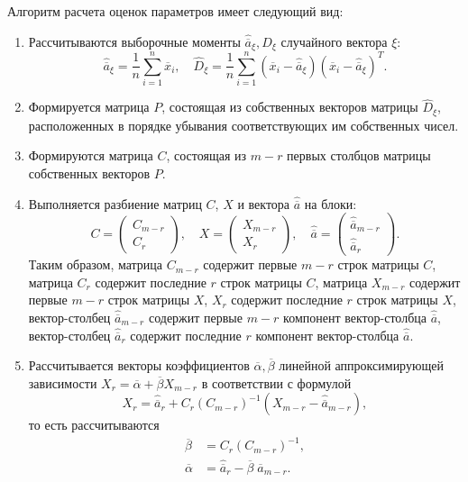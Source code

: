 Алгоритм расчета оценок параметров имеет следующий вид:
\begin{enumerate}
\item Рассчитываются выборочные моменты \( \hat{\overline{a}}_{\xi}, D_{\xi} \) случайного вектора \( \xi \):
  \begin{equation*}
    \hat{\overline{a}}_{\xi} = \dfrac{1}{n} \sum_{i=1}^n \overline{x}_i, \quad
    \hat{D}_{\xi} =
    \dfrac{1}{n}  \sum_{i=1}^n
    (\overline{x}_i - \hat{\overline{a}}_{\xi})
    (\overline{x}_i - \hat{\overline{a}}_{\xi})^T.
  \end{equation*}
\item Формируется матрица \( P \), состоящая из собственных векторов матрицы \( \hat{D}_{\xi} \),
  расположенных в порядке убывания соответствующих им собственных чисел.
\item Формируются матрица \( C \), состоящая из \( m-r \) первых столбцов
  матрицы собственных векторов \( P \).
\item Выполняется разбиение матриц \( C \), \( X \) и вектора \( \hat{\overline{a}} \) на блоки:
  \begin{equation*}
    C =
    \begin{pmatrix}
      C_{m-r} \\
      C_{r}
    \end{pmatrix}, \quad
    X =
    \begin{pmatrix}
      X_{m-r} \\
      X_{r}
    \end{pmatrix}, \quad
    \hat{\overline{a}} =
    \begin{pmatrix}
      \hat{\overline{a}}_{m-r} \\
      \hat{\overline{a}}_{r}
    \end{pmatrix}.
  \end{equation*}
  Таким образом, матрица \( C_{m-r} \)  содержит первые \( m-r \) строк матрицы \( C \),
  матрица \( C_{r} \)  содержит последние \( r \) строк матрицы \( C \),
  матрица \( X_{m-r} \) содержит первые \( m-r \) строк матрицы \( X \),
  \( X_{r} \) содержит последние \( r \) строк матрицы \( X \),
  вектор-столбец \( \hat{\overline{a}}_{m-r} \) содержит первые \( m - r \) компонент
  вектор-столбца \( \hat{\overline{a}} \),
  вектор-столбец \( \hat{\overline{a}}_{r} \) содержит последние \( r \) компонент
  вектор-столбца \( \hat{\overline{a}} \).
\item Рассчитывается векторы коэффициентов \( \overline{\alpha}, \overline{\beta} \)
  линейной аппроксимирующей зависимости
  \( X_r = \overline{\alpha} + \overline{\beta} X_{m-r}\)
  в соответствии с формулой
  \[ X_r = \hat{\overline{a}}_r + C_r (C_{m-r})^{-1} (X_{m-r} - \hat{\overline{a}}_{m-r}), \]
  то есть рассчитываются
  \begin{equation*}
    \begin{aligned}
      \overline{\beta} &= C_{r} (C_{m-r})^{-1}, \\
      \overline{\alpha} &= \hat{\overline{a}}_{r} - \overline{\beta} \; \hat{\overline{a}}_{m-r}.
    \end{aligned}
  \end{equation*}
\end{enumerate}

